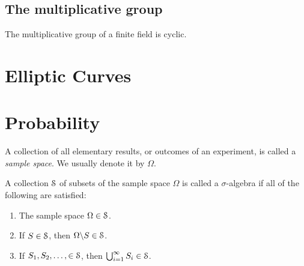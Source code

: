 \documentclass[a4paper, 12pt]{book} %
\begin{document}
\section{The multiplicative group}

\begin{proposition}
     The multiplicative group of a finite field is cyclic.
\end{proposition}

\chapter{Elliptic Curves}


\chapter{Probability}


\begin{definition}
    A collection of all elementary results, or outcomes of an experiment, is called a \emph{sample space}. We usually denote it by $\Omega$.
\end{definition}




\begin{definition}
    A collection $\EuScript{S}$ of subsets of the sample space $\Omega$ is called a $\sigma$-algebra if all of the following are satisfied:
    \begin{enumerate}
        \item The sample space $\Omega \in \EuScript{S}$.
        \item If $S \in \EuScript{S}$, then $\Omega \backslash S \in \EuScript{S}$.
        \item If $S_1, S_2, \ldots,  \in \EuScript{S}$, then $\bigcup_{i=1}^\infty S_i \in \EuScript{S}$.
    \end{enumerate}
\end{definition}
\end{document}
